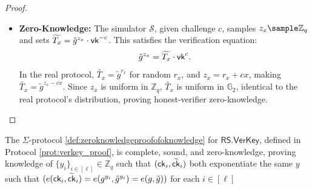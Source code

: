 \begin{proof}
\begin{itemize}
        \item \textbf{Zero-Knowledge:} The simulator $\mathcal{S}$, given challenge $c$, samples $z_x \sample \mathbb{Z}_q$ and sets $\widetilde{T_{x}} = \tilde{g}^{z_x} \cdot \mathsf{vk}^{-c}$. This satisfies the verification equation:
        \[
        \tilde{g}^{z_x} = \widetilde{T_{x}} \cdot \mathsf{vk}^c.
        \]
        In the real protocol, $\widetilde{T_{x}} = \tilde{g}^{r_x}$ for random $r_x$, and $z_x = r_x + c x$, making $\widetilde{T_{x}} = \tilde{g}^{z_x - c x}$. Since $z_x$ is uniform in $\mathbb{Z}_q$, $\widetilde{T_{x}}$ is uniform in $\mathbb{G}_2$, identical to the real protocol’s distribution, proving honest-verifier zero-knowledge.
    \end{itemize}
\end{proof}


\begin{theorem}
    The $\Sigma$-protocol \ref{def:zeroknowledgeproofofoknowledge} for $\mathsf{RS.VerKey}$, defined in Protocol \ref{prot:verkey_proof}, is complete, sound, and zero-knowledge, proving knowledge of $\{y_i\}_{i \in [\ell]} \in \mathbb{Z}_q$ such that $(\mathsf{ck}_i, \widetilde{\mathsf{ck}}_i)$ both exponentiate the same $y$ such that $(e(\mathsf{ck}_i, \widetilde{\mathsf{ck}}_i) = e(g^{y_i}, \tilde{g}^{y_i}) = e(g, \tilde{g}))$ for each $i \in [\ell]$
\end{theorem}

